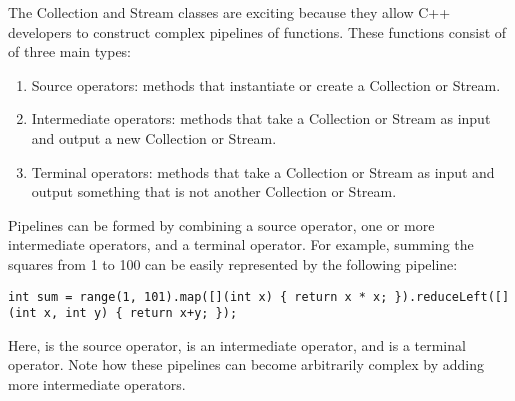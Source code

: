 

The Collection and Stream classes are exciting because they allow C++ developers to construct complex pipelines of functions.
These functions consist of of three main types:

\begin{enumerate}
  \item{Source operators: methods that instantiate or create a Collection or Stream.}
  \item{Intermediate operators: methods that take a Collection or Stream as input and output a new Collection or Stream.}
  \item{Terminal operators: methods that take a Collection or Stream as input and output something that is not another Collection or Stream.}
\end{enumerate}

Pipelines can be formed by combining a source operator, one or more intermediate operators, and a terminal operator.
For example, summing the squares from 1 to 100 can be easily represented by the following pipeline:

\begin{lstlisting}
int sum = range(1, 101).map([](int x) { return x * x; }).reduceLeft([](int x, int y) { return x+y; });
\end{lstlisting}

Here,  is the source operator,  is an intermediate operator, and  is a terminal operator.
Note how these pipelines can become arbitrarily complex by adding more intermediate operators.

